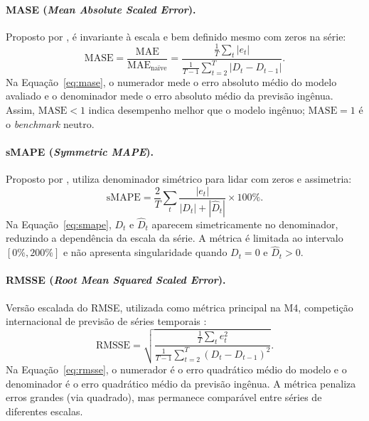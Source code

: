 \paragraph{MASE (\textit{Mean Absolute Scaled Error}).}
Proposto por \citet{Hyndman2006MASE}, é invariante à escala e bem definido mesmo com zeros na série:
\begin{equation}
  \text{MASE} = \frac{\text{MAE}}{\text{MAE}_{\text{naïve}}} = \frac{\frac{1}{T}\sum_t |e_t|}{\frac{1}{T-1}\sum_{t=2}^{T}|D_t - D_{t-1}|}.
  \label{eq:mase}
\end{equation}
Na Equação~\ref{eq:mase}, o numerador mede o erro absoluto médio do modelo avaliado e o denominador mede o erro absoluto médio da previsão ingênua. Assim, $\text{MASE} < 1$ indica desempenho melhor que o modelo ingênuo; $\text{MASE} = 1$ é o \textit{benchmark} neutro.

\paragraph{sMAPE (\textit{Symmetric MAPE}).}
Proposto por \citet{Makridakis1993SMAPE}, utiliza denominador simétrico para lidar com zeros e assimetria:
\begin{equation}
  \text{sMAPE} = \frac{2}{T}\sum_t \frac{|e_t|}{|D_t| + |\hat{D}_t|} \times 100\%.
  \label{eq:smape}
\end{equation}
Na Equação~\ref{eq:smape}, $D_t$ e $\hat{D}_t$ aparecem simetricamente no denominador, reduzindo a dependência da escala da série. A métrica é limitada ao intervalo $[0\%, 200\%]$ e não apresenta singularidade quando $D_t = 0$ e $\hat{D}_t > 0$.

\paragraph{RMSSE (\textit{Root Mean Squared Scaled Error}).}
Versão escalada do RMSE, utilizada como métrica principal na M4, competição internacional de previsão de séries temporais \citep{Makridakis2020M4Competition}:
\begin{equation}
  \text{RMSSE} = \sqrt{\frac{\frac{1}{T}\sum_t e_t^2}{\frac{1}{T-1}\sum_{t=2}^{T}(D_t - D_{t-1})^2}}.
  \label{eq:rmsse}
\end{equation}
Na Equação~\ref{eq:rmsse}, o numerador é o erro quadrático médio do modelo e o denominador é o erro quadrático médio da previsão ingênua. A métrica penaliza erros grandes (via quadrado), mas permanece comparável entre séries de diferentes escalas.


